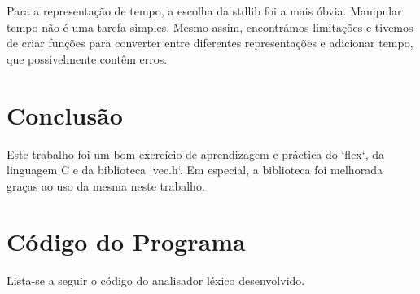 \documentclass{report}
\begin{document}
Para a representação de tempo, a escolha da stdlib foi a mais óbvia. Manipular tempo não é uma tarefa simples. Mesmo assim, encontrámos limitações e tivemos de criar funções para converter entre diferentes representações e adicionar tempo, que possivelmente contêm erros.\\

\chapter{Conclusão} \label{concl}

Este trabalho foi um bom exercício de aprendizagem e práctica do `flex`, da linguagem C e da biblioteca `vec.h`. Em especial, a biblioteca foi melhorada graças ao uso da mesma neste trabalho.\\

\appendix
\chapter{Código do Programa}

Lista-se a seguir o código do analisador léxico desenvolvido.





\end{document}

